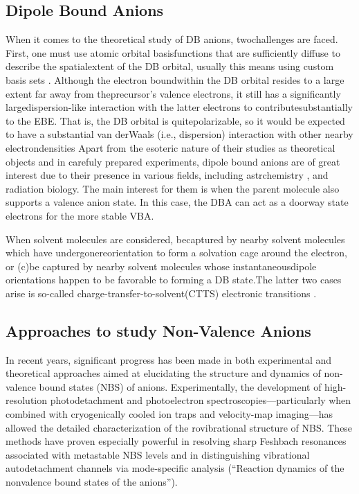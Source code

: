 \subsection{Dipole Bound Anions}
When it comes to the theoretical study of DB anions, twochallenges are faced. First, one must use atomic orbital basisfunctions that are sufficiently diffuse to describe the spatialextent of the DB orbital, usually this means using custom basis sets \cite{skurski2000choose}.
Although the electron boundwithin the DB orbital resides to a large extent far away from theprecursor's valence electrons, it still has a significantly largedispersion-like interaction with the latter electrons to contributesubstantially to the EBE. That is, the DB orbital is quitepolarizable, so it would be expected to have a substantial van derWaals (i.e., dispersion) interaction with other nearby electrondensities\cite{gutowski1996contribution}
Apart from the esoteric nature of their studies as theoretical objects and in carefuly prepared experiments, dipole bound anions are of great interest due to their presence in various fields, including astrchemistry \cite{fortenberry2015interstellar}, and radiation biology\cite{narayanan2023secondary,sedmidubska2024interaction}. The main interest for them is when the parent molecule also supports a valence anion state. In this case, the DBA can act as a doorway state electrons for the more stable VBA.

When solvent molecules are considered, becaptured by nearby solvent molecules which have undergonereorientation to form a solvation cage around the electron, or (c)be captured by nearby solvent molecules whose instantaneousdipole orientations happen to be favorable to forming a DB state.The latter two cases arise is so-called charge-transfer-to-solvent(CTTS) electronic transitions \cite{bradforth2002excited,chen2000precursors}.

\subsection{Approaches to study Non-Valence Anions}
In recent years, significant progress has been made in both experimental and theoretical approaches aimed at elucidating the structure and dynamics of non-valence bound states (NBS) of anions. Experimentally, the development of high-resolution photodetachment and photoelectron spectroscopies—particularly when combined with cryogenically cooled ion traps and velocity-map imaging—has allowed the detailed characterization of the rovibrational structure of NBS. These methods have proven especially powerful in resolving sharp Feshbach resonances associated with metastable NBS levels and in distinguishing vibrational autodetachment channels via mode-specific analysis (“Reaction dynamics of the nonvalence bound states of the anions”).

